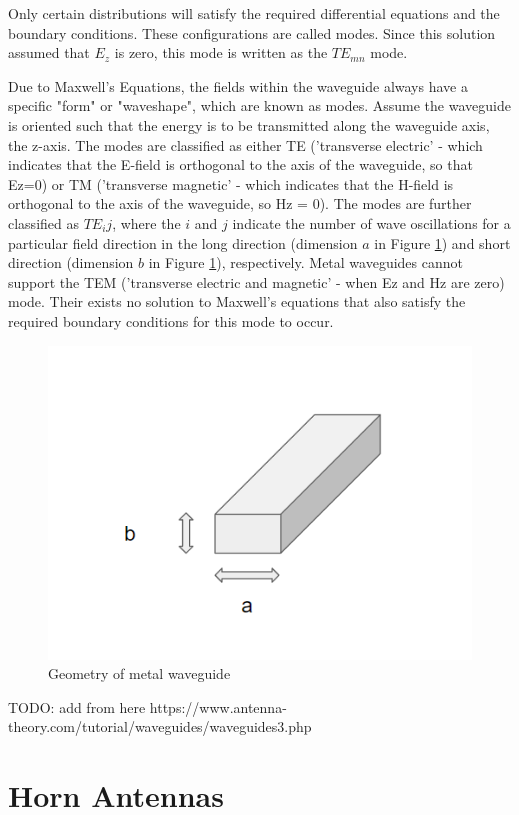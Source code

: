 \documentclass[a4paper,12pt]{report}
\begin{document}
Only certain distributions will satisfy the required differential equations
and the boundary conditions. These configurations are called modes.
Since this solution assumed that $E_z$ is zero, this mode is written as the $TE_{mn}$ mode.

Due to Maxwell's Equations,
the fields within the waveguide always have a specific "form" or "waveshape",
which are known as modes.
Assume the waveguide is oriented such that the energy is to be transmitted along the waveguide axis, the z-axis.
The modes are classified as either TE
('transverse electric' - which indicates that the E-field is orthogonal to the axis of the waveguide, so that Ez=0)
or TM ('transverse magnetic' - which indicates that the H-field is orthogonal to the axis of the waveguide, so Hz = 0).
The modes are further classified as $TE_ij$,
where the $i$ and $j$ indicate the number of wave oscillations for a particular
field direction in the long direction (dimension $a$ in Figure \ref{fig:metal_waveguide_geometry})
and short direction (dimension $b$ in Figure \ref{fig:metal_waveguide_geometry}), respectively.
Metal waveguides cannot support the TEM
('transverse electric and magnetic' - when Ez and Hz are zero) mode.
Their exists no solution to Maxwell's equations
that also satisfy the required boundary conditions for this mode to occur.

\begin{figure}
  \begin{center}
    \includegraphics[clip, keepaspectratio, width=0.5\linewidth]{img/metal_waveguide_with_dims.png}
    \caption{Geometry of metal waveguide}
    \label{fig:metal_waveguide_geometry}
  \end{center}
\end{figure}

TODO: add from here https://www.antenna-theory.com/tutorial/waveguides/waveguides3.php


\section{Horn Antennas}
\end{document}
